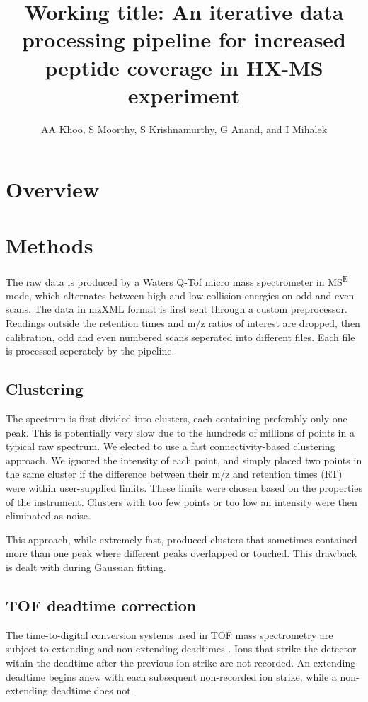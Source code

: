 \documentclass[10pt]{scrartcl}
\title{Working title: An iterative data processing pipeline for increased peptide coverage in HX-MS experiment}
\author{AA Khoo, S Moorthy, S Krishnamurthy, G Anand, and I Mihalek}
\begin{document}
\maketitle
\begin{abstract}


\end{abstract}


\section{Overview}


\section{Methods}
The raw data is produced by a Waters Q-Tof micro mass spectrometer in MS\textsuperscript{E} mode, which alternates between high and low collision energies on odd and even scans. The data in mzXML format is first sent through a custom preprocessor. Readings outside the retention times and m/z ratios of interest are dropped, then calibration, odd and even numbered scans seperated into different files. Each file is processed seperately by the pipeline.

\subsection{Clustering}
The spectrum is first divided into clusters, each containing preferably only one peak. This is potentially very slow due to the hundreds of millions of points in a typical raw spectrum. We elected to use a fast connectivity-based clustering approach. We ignored the intensity of each point, and simply placed two points in the same cluster if the difference between their m/z and retention times (RT) were within user-supplied limits. These limits were chosen based on the properties of the instrument. Clusters with too few points or too low an intensity were then eliminated as noise.

This approach, while extremely fast, produced clusters that sometimes contained more than one peak where different peaks overlapped or touched. This drawback is dealt with during Gaussian fitting.

\subsection{TOF deadtime correction}
The time-to-digital conversion systems used in TOF mass spectrometry are subject to extending and non-extending deadtimes \cite{}. Ions that strike the detector within the deadtime after the previous ion strike are not recorded. An extending deadtime begins anew with each subsequent non-recorded ion strike, while a non-extending deadtime does not.
\end{document}
